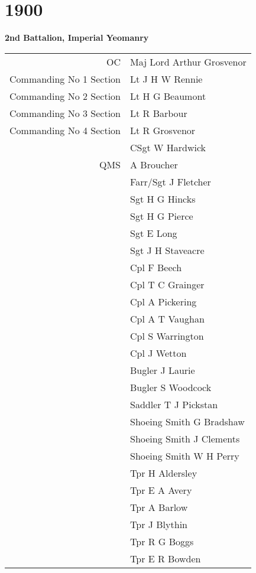 \chapter*{1900}

\begin{center}
  \Large
  \textbf{2nd Battalion, Imperial Yeomanry}
\end{center}

\begin{center}
  \begin{tabular}{rl}
    OC & Maj Lord Arthur Grosvenor \\
    Commanding No 1 Section & Lt J H W Rennie \\
    Commanding No 2 Section & Lt H G Beaumont \\
    Commanding No 3 Section & Lt R Barbour \\
    Commanding No 4 Section & Lt R Grosvenor \\
    & CSgt W Hardwick \\
    QMS & A Broucher \\
    & Farr/Sgt J Fletcher \\
    & Sgt H G Hincks \\
    & Sgt H G Pierce \\
    & Sgt E Long \\
    & Sgt J H Staveacre \\
    & Cpl F Beech \\
    & Cpl T C Grainger \\
    & Cpl A Pickering \\
    & Cpl A T Vaughan \\
    & Cpl S Warrington \\
    & Cpl J Wetton \\
    & Bugler J Laurie \\
    & Bugler S Woodcock \\
    & Saddler T J Pickstan \\
    & Shoeing Smith G Bradshaw \\
    & Shoeing Smith J Clements \\
    & Shoeing Smith W H Perry \\
    & Tpr H Aldersley \\
    & Tpr E A Avery \\
    & Tpr A Barlow \\
    & Tpr J Blythin \\
    & Tpr R G Boggs \\
    & Tpr E R Bowden \\

\end{tabular}
\end{center}
